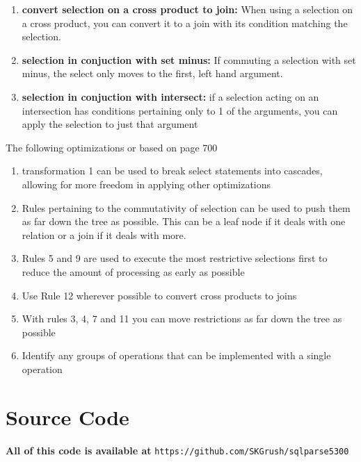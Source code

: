 \documentclass{article}
\begin{document}
\begin{enumerate}
  \item \textbf{convert selection on a cross product to join:} When using a selection on a cross product, you can convert it
  to a join with its condition matching the selection.

  \item \textbf{selection in conjuction with set minus:} If commuting a selection with set minus, the select only moves to the first,
  left hand argument.

  \item \textbf{selection in conjuction with intersect:} if a selection acting on an intersection has conditions pertaining
  only to 1 of the arguments, you can apply the selection to just that argument
\end{enumerate}

The following optimizations or based on page 700

\begin{enumerate}
  \item transformation 1 can be used to break select statements into cascades, allowing for more freedom in applying
  other optimizations

  \item Rules pertaining to the commutativity of selection can be used to push them as far down the tree as possible.
  This can be a leaf node if it deals with one relation or a join if it deals with more.

  \item Rules 5 and 9 are used to execute the most restrictive selections first to reduce the amount of processing
  as early as possible

  \item Use Rule 12 wherever possible to convert cross products to joins

  \item With rules 3, 4, 7 and 11 you can move restrictions as far down the tree as possible

  \item Identify any groups of operations that can be implemented with a single operation
\end{enumerate}
\pagebreak

\section{Source Code}

{\large \textbf{All of this code is available at} \verb|https://github.com/SKGrush/sqlparse5300|}
\end{document}
